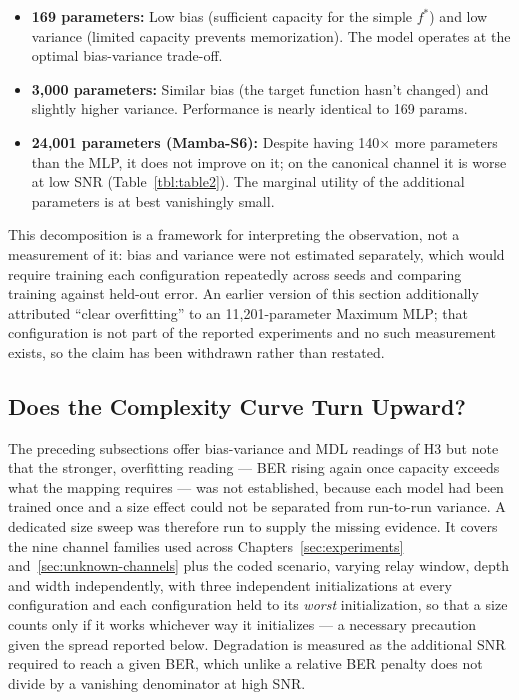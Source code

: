 \begin{itemize}
\tightlist
\item
  \textbf{169 parameters:} Low bias (sufficient capacity for the simple \(f^*\)) and low variance (limited capacity prevents memorization). The model operates at the optimal bias-variance trade-off.
\item
  \textbf{3,000 parameters:} Similar bias (the target function hasn't changed) and slightly higher variance. Performance is nearly identical to 169 params.
\item
  \textbf{24,001 parameters (Mamba-S6):} Despite having 140$\times$ more parameters than the MLP, it does not improve on it; on the canonical channel it is worse at low SNR (Table~\ref{tbl:table2}). The marginal utility of the additional parameters is at best vanishingly small.
\end{itemize}

This decomposition is a framework for interpreting the observation, not a measurement of it: bias and variance were not estimated separately, which would require training each configuration repeatedly across seeds and comparing training against held-out error. An earlier version of this section additionally attributed ``clear overfitting'' to an 11{,}201-parameter Maximum MLP; that configuration is not part of the reported experiments and no such measurement exists, so the claim has been withdrawn rather than restated.

\subsection{Does the Complexity Curve Turn Upward?}\label{sec:complexity-curve-turn}

The preceding subsections offer bias-variance and MDL readings of H3 but note that the stronger, overfitting reading --- BER rising again once capacity exceeds what the mapping requires --- was not established, because each model had been trained once and a size effect could not be separated from run-to-run variance. A dedicated size sweep was therefore run to supply the missing evidence. It covers the nine channel families used across Chapters~\ref{sec:experiments} and~\ref{sec:unknown-channels} plus the coded scenario, varying relay window, depth and width independently, with three independent initializations at every configuration and each configuration held to its \emph{worst} initialization, so that a size counts only if it works whichever way it initializes --- a necessary precaution given the spread reported below. Degradation is measured as the additional SNR required to reach a given BER, which unlike a relative BER penalty does not divide by a vanishing denominator at high SNR.

